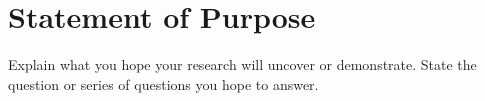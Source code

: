 
\section[Statement of Purpose]{Statement of Purpose}

Explain what you hope your research will uncover or demonstrate. State the question or series of questions you hope to answer.